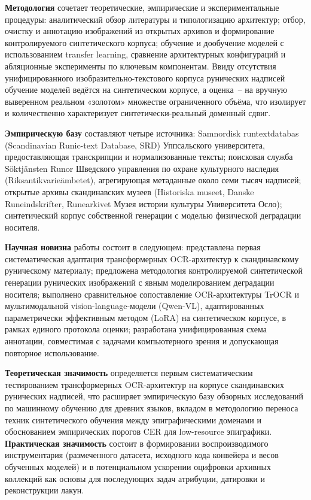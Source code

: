 \documentclass[a4paper,12pt]{extarticle}
\begin{document}
\textbf{Методология} сочетает теоретические, эмпирические и экспериментальные процедуры: аналитический обзор литературы и типологизацию архитектур; отбор, очистку и аннотацию изображений из открытых архивов и формирование контролируемого синтетического корпуса; обучение и дообучение моделей с использованием transfer learning, сравнение архитектурных конфигураций и абляционные эксперименты по ключевым компонентам. Ввиду отсутствия унифицированного изобразительно-текстового корпуса рунических
надписей обучение моделей ведётся
на синтетическом корпусе, а оценка~-- на вручную выверенном реальном «золотом»
множестве ограниченного объёма, что изолирует и количественно характеризует
синтетически-реальный доменный сдвиг.
 
\textbf{Эмпирическую базу} составляют четыре источника: Samnordisk runtextdatabas (Scandinavian Runic-text Database, SRD) Уппсальского университета, предоставляющая транскрипции и нормализованные тексты; поисковая служба Söktjänsten Runor Шведского управления по охране культурного наследия (Riksantikvarieämbetet), агрегирующая метаданные около семи тысяч надписей; открытые архивы скандинавских музеев (Historiska museet, Danske Runeindskrifter, Runearkivet Музея истории культуры Университета Осло); синтетический корпус собственной генерации с моделью физической деградации носителя.
 
\textbf{Научная новизна} работы состоит в следующем: представлена первая систематическая адаптация трансформерных OCR-архитектур к скандинавскому руническому материалу; предложена методология контролируемой синтетической генерации рунических изображений с явным моделированием деградации носителя; выполнено сравнительное сопоставление OCR-архитектуры TrOCR
и мультимодальной vision-language-модели (Qwen-VL), адаптированных параметрически
эффективным методом (LoRA) на синтетическом корпусе, в рамках единого протокола оценки; разработана унифицированная схема аннотации, совместимая с задачами компьютерного зрения и допускающая повторное использование.
 
\textbf{Теоретическая значимость} определяется первым систематическим тестированием трансформерных OCR-архитектур на корпусе скандинавских рунических надписей, что расширяет эмпирическую базу обзорных исследований по машинному обучению для древних языков, вкладом в методологию переноса техник синтетического обучения между эпиграфическими доменами и обоснованием эмпирических порогов CER для low-resource эпиграфики. \textbf{Практическая значимость} состоит в формировании воспроизводимого инструментария (размеченного датасета, исходного кода конвейера и весов обученных моделей) и в потенциальном ускорении оцифровки архивных коллекций как основы для последующих задач атрибуции, датировки и реконструкции лакун.
 
\end{document}

